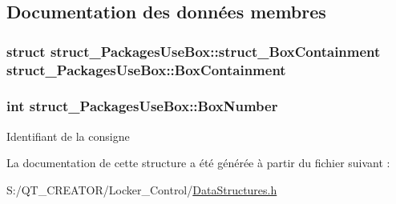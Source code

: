 \subsection{Documentation des données membres}
\hypertarget{structstruct___packages_use_box_acf60daf8fe7ce9e18713f0d99a8752dc}{}
\subsubsection[{Box\+Containment}]{\setlength{\rightskip}{0pt plus 5cm}struct {\bf struct\+\_\+\+Packages\+Use\+Box\+::struct\+\_\+\+Box\+Containment} struct\+\_\+\+Packages\+Use\+Box\+::\+Box\+Containment}\label{structstruct___packages_use_box_acf60daf8fe7ce9e18713f0d99a8752dc}
\hypertarget{structstruct___packages_use_box_a4edfedee9f32056cdce6d6908933e136}{}
\subsubsection[{Box\+Number}]{\setlength{\rightskip}{0pt plus 5cm}int struct\+\_\+\+Packages\+Use\+Box\+::\+Box\+Number}\label{structstruct___packages_use_box_a4edfedee9f32056cdce6d6908933e136}
Identifiant de la consigne 

La documentation de cette structure a été générée à partir du fichier suivant \+:\begin{DoxyCompactItemize}
\item 
S\+:/\+Q\+T\+\_\+\+C\+R\+E\+A\+T\+O\+R/\+Locker\+\_\+\+Control/\hyperlink{_data_structures_8h}{Data\+Structures.\+h}\end{DoxyCompactItemize}
